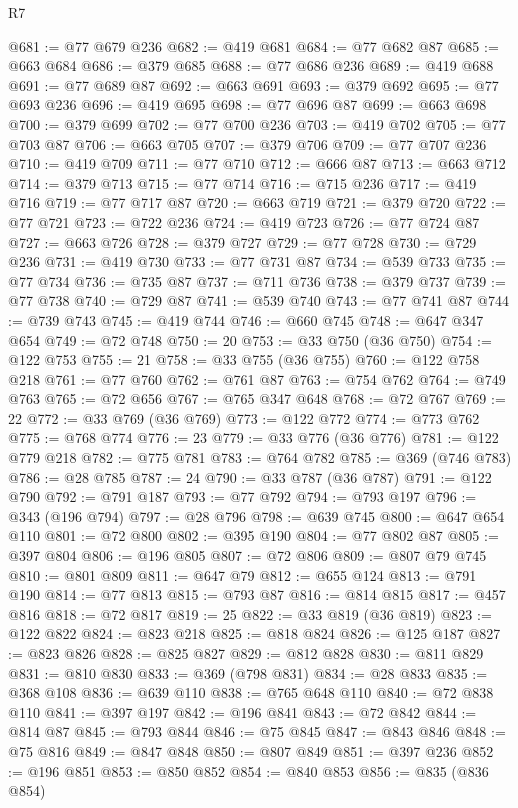 \begin{lexlean}{R7}
\begin{coremodule}
@681 := @77 @679 @236
@682 := @419 @681
@684 := @77 @682 @87
@685 := @663 @684
@686 := @379 @685
@688 := @77 @686 @236
@689 := @419 @688
@691 := @77 @689 @87
@692 := @663 @691
@693 := @379 @692
@695 := @77 @693 @236
@696 := @419 @695
@698 := @77 @696 @87
@699 := @663 @698
@700 := @379 @699
@702 := @77 @700 @236
@703 := @419 @702
@705 := @77 @703 @87
@706 := @663 @705
@707 := @379 @706
@709 := @77 @707 @236
@710 := @419 @709
@711 := @77 @710
@712 := @666 @87
@713 := @663 @712
@714 := @379 @713
@715 := @77 @714
@716 := @715 @236
@717 := @419 @716
@719 := @77 @717 @87
@720 := @663 @719
@721 := @379 @720
@722 := @77 @721
@723 := @722 @236
@724 := @419 @723
@726 := @77 @724 @87
@727 := @663 @726
@728 := @379 @727
@729 := @77 @728
@730 := @729 @236
@731 := @419 @730
@733 := @77 @731 @87
@734 := @539 @733
@735 := @77 @734
@736 := @735 @87
@737 := @711 @736
@738 := @379 @737
@739 := @77 @738
@740 := @729 @87
@741 := @539 @740
@743 := @77 @741 @87
@744 := @739 @743
@745 := @419 @744
@746 := @660 @745
@748 := @647 @347 @654
@749 := @72 @748
@750 := 20
@753 := @33 @750 (@36 @750)
@754 := @122 @753
@755 := 21
@758 := @33 @755 (@36 @755)
@760 := @122 @758 @218
@761 := @77 @760
@762 := @761 @87
@763 := @754 @762
@764 := @749 @763
@765 := @72 @656
@767 := @765 @347 @648
@768 := @72 @767
@769 := 22
@772 := @33 @769 (@36 @769)
@773 := @122 @772
@774 := @773 @762
@775 := @768 @774
@776 := 23
@779 := @33 @776 (@36 @776)
@781 := @122 @779 @218
@782 := @775 @781
@783 := @764 @782
@785 := @369 (@746 @783)
@786 := @28 @785
@787 := 24
@790 := @33 @787 (@36 @787)
@791 := @122 @790
@792 := @791 @187
@793 := @77 @792
@794 := @793 @197
@796 := @343 (@196 @794)
@797 := @28 @796
@798 := @639 @745
@800 := @647 @654 @110
@801 := @72 @800
@802 := @395 @190
@804 := @77 @802 @87
@805 := @397 @804
@806 := @196 @805
@807 := @72 @806
@809 := @807 @79 @745
@810 := @801 @809
@811 := @647 @79
@812 := @655 @124
@813 := @791 @190
@814 := @77 @813
@815 := @793 @87
@816 := @814 @815
@817 := @457 @816
@818 := @72 @817
@819 := 25
@822 := @33 @819 (@36 @819)
@823 := @122 @822
@824 := @823 @218
@825 := @818 @824
@826 := @125 @187
@827 := @823 @826
@828 := @825 @827
@829 := @812 @828
@830 := @811 @829
@831 := @810 @830
@833 := @369 (@798 @831)
@834 := @28 @833
@835 := @368 @108
@836 := @639 @110
@838 := @765 @648 @110
@840 := @72 @838 @110
@841 := @397 @197
@842 := @196 @841
@843 := @72 @842
@844 := @814 @87
@845 := @793 @844
@846 := @75 @845
@847 := @843 @846
@848 := @75 @816
@849 := @847 @848
@850 := @807 @849
@851 := @397 @236
@852 := @196 @851
@853 := @850 @852
@854 := @840 @853
@856 := @835 (@836 @854)

\end{coremodule}
\end{lexlean}
